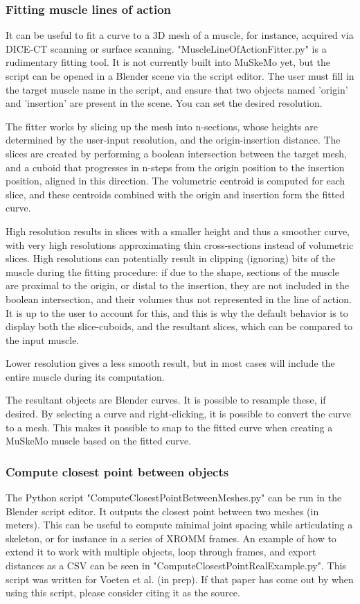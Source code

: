 \documentclass{article}
\begin{document}
\subsubsection{Fitting muscle lines of action}
It can be useful to fit a curve to a 3D mesh of a muscle, for instance, acquired via DICE-CT scanning or surface scanning. "MuscleLineOfActionFitter.py" is a rudimentary fitting tool. It is not currently built into MuSkeMo yet, but the script can be opened in a Blender scene via the script editor. The user must fill in the target muscle name in the script, and ensure that two objects named 'origin' and 'insertion' are present in the scene. You can set the desired resolution.

The fitter works by slicing up the mesh into n-sections, whose heights are determined by the user-input resolution, and the origin-insertion distance. The slices are created by performing a boolean intersection between the target mesh, and a cuboid that progresses in n-steps from the origin position to the insertion position, aligned in this direction. The volumetric centroid is computed for each slice, and these centroids combined with the origin and insertion form the fitted curve. 

High resolution results in slices with a smaller height and thus a smoother curve, with very high resolutions approximating thin cross-sections instead of volumetric slices. High resolutions can potentially result in clipping (ignoring) bits of the muscle during the fitting procedure: if due to the shape, sections of the muscle are proximal to the origin, or distal to the insertion, they are not included in the boolean intersection, and their volumes thus not represented in the line of action. It is up to the user to account for this, and this is why the default behavior is to display both the slice-cuboids, and the resultant slices, which can be compared to the input muscle.

Lower resolution gives a less smooth result, but in most cases will include the entire muscle during its computation. 

The resultant objects are Blender curves. It is possible to resample these, if desired. By selecting a curve and right-clicking, it is possible to convert the curve to a mesh. This makes it possible to snap to the fitted curve when creating a MuSkeMo muscle based on the fitted curve.

\subsubsection{Compute closest point between objects}
The Python script "ComputeClosestPointBetweenMeshes.py" can be run in the Blender script editor. It outputs the closest point between two meshes (in meters). This can be useful to compute minimal joint spacing while articulating a skeleton, or for instance in a series of XROMM frames. An example of how to extend it to work with multiple objects, loop through frames, and export distances as a CSV can be seen in "ComputeClosestPointRealExample.py". This script was written for Voeten et al. (in prep). If that paper has come out by when using this script, please consider citing it as the source.
\end{document}

